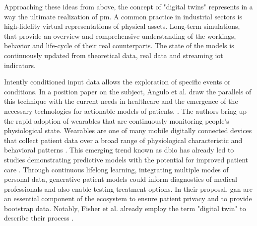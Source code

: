             Approaching these ideas from above, the concept of "digital twins" represents in a way the ultimate realization of \gls{pm}. A common practice in industrial sectors is high-fidelity virtual representations of physical assets. Long-term simulations, that provide an overview and comprehensive understanding of the workings, behavior and life-cycle of their real counterparts. The state of the models is continuously updated from theoretical data, real data and streaming \gls{iot} indicators.\par
            Intently conditioned input data allows the exploration of specific events or conditions. In a position paper on the subject, Angulo et al. draw the parallels of this technique with the current needs in healthcare and the emergence of the necessary technologies for actionable models of patients. \cite{angulo2019towards,Angulo_2020}. The authors bring up the rapid adoption of wearables that are continuously monitoring people's physiological state. 
            Wearables are one of many mobile digitally connected devices that collect patient data over a broad range of physiological characteristic and behavioral patterns \cite{coravos2019developing}. This emerging trend known as \gls{dbio} has already led to studies demonstrating predictive models with the potential for improved patient care \cite{snyder2018best}. Through continuous lifelong learning, integrating  multiple modes of personal data, generative patient models could inform diagnostics of medical professionals and also enable testing treatment options. In their proposal, \gls{gan} are an essential component of the ecosystem to ensure patient privacy and to provide bootstrap data. Notably, Fisher et al. already employ the term "digital twin" to describe their process \cite{walsh2020generating}.
        
